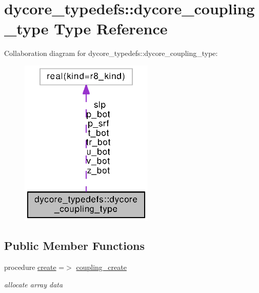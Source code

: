 \section{dycore\-\_\-typedefs\-:\-:dycore\-\_\-coupling\-\_\-type Type Reference}
\label{structdycore__typedefs_1_1dycore__coupling__type}


Collaboration diagram for dycore\-\_\-typedefs\-:\-:dycore\-\_\-coupling\-\_\-type\-:
\nopagebreak
\begin{figure}[H]
\begin{center}
\leavevmode
\includegraphics[width=180pt]{structdycore__typedefs_1_1dycore__coupling__type__coll__graph}
\end{center}
\end{figure}
\subsection*{Public Member Functions}
\begin{DoxyCompactItemize}
\item 
procedure \hyperlink{structdycore__typedefs_1_1dycore__coupling__type_a5595a255bb531fcd690fce7641670853}{create} =$>$ \hyperlink{classdycore__typedefs_a38faf32efa46d5157193e3c6ff98533e}{coupling\-\_\-create}
\begin{DoxyCompactList}\small\item\em allocate array data \end{DoxyCompactList}\end{DoxyCompactItemize}
